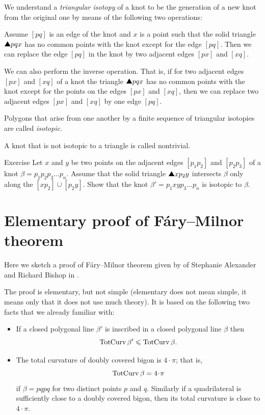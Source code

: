 We understand a \emph{triangular isotopy} of a knot to be the generation of a new knot from the original one by means of the
following two operations:

Assume $[pq]$ is an edge of the knot and $x$
is a point such that the solid triangle $\solidtriangle pqx$  has no common points with the knot except for the edge $[pq]$.
Then we can replace the edge $[pq]$ in the knot by two adjacent edges $[px]$ and $[xq]$.

We can also perform the inverse operation.
That is, if for two adjacent edges $[px]$ and $[xq]$ of a knot the triangle
$\solidtriangle pqx$ has no common points with the knot except for the points on the edges $[px]$ and $[xq]$,
then we can replace two adjacent edges $[px]$ and $[xq]$ by one edge $[pq]$.

Polygons that arise from one another by a finite sequence of
triangular isotopies are called \emph{isotopic}.

A knot that is not isotopic to a triangle is called nontrivial.

\begin{thm}{Exercise}\label{ex:triangle-isotopy}
Let $x$ and $y$ be two points on the adjacent edges $[p_1p_2]$ and $[p_2p_3]$ of a knot $\beta=p_1p_2p_3\dots p_n$.
Assume that the solid triangle $\solidtriangle xp_2y$ intersects $\beta$ only along the $[xp_2]\cup [p_2y]$.
Show that the knot $\beta'=p_1xyp_3\dots p_n$ is isotopic to $\beta$.
\end{thm}



\section{Elementary proof of F\'ary--Milnor theorem}

Here we sketch a proof of F\'ary--Milnor theorem given by of Stephanie Alexander and Richard Bishop in \cite{alexander-bishop}.

The proof is elementary, but not simple 
(elementary does not mean simple, it means only that it does not use much theory).
It is based on the following two facts that we already familiar with:
\begin{itemize}
\item If a closed polygonal line $\beta'$ is inscribed in a closed polygonal line $\beta$ then 
 \[\mathop{\rm TotCurv}\nolimits\beta'\leqslant \mathop{\rm TotCurv}\nolimits\beta.\]
\item The total curvature of doubly covered
bigon is $4\cdot\pi$; that is,
\[\tc\beta=4\cdot\pi\]
if $\beta=pqpq$ for two distinct points $p$ and $q$.
Similarly if a quadrilateral is sufficiently close to a doubly covered
bigon, then its total curvature is close to $4\cdot\pi$.
\end{itemize}


